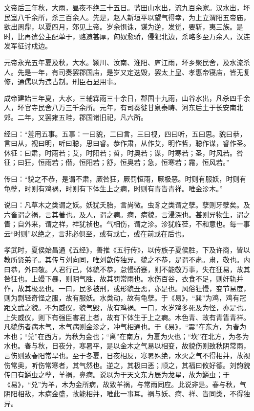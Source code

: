 \documentclass[]{article}
\begin{document}
文帝后三年秋，大雨，昼夜不绝三十五日。蓝田山水出，流九百余家。汉水出，坏民室八千余所，杀三百余人。先是，赵人新垣平以望气得幸，为上立渭阳五帝庙，欲出周鼎，以夏四月，郊见上帝。岁余惧诛，谋为逆，发觉，要斩，夷三族。是时，比再遣公主配单于，赂遗甚厚，匈奴愈骄，侵犯北边，杀略多至万余人，汉连发军征讨戍边。

元帝永光五年夏及秋，大水。颍川、汝南、淮阳、庐江雨，坏乡聚民舍，及水流杀人。先是一年，有司奏罢郡国庙，是岁又定迭毁，罢太上皇、孝惠帝寝庙，皆无复修，通儒以为违古制。刑臣石显用事。

成帝建始三年夏，大水，三辅霖雨三十余日，郡国十九雨，山谷水出，凡杀四千余人，坏官寺民舍八万三千余所。元年，有司奏徙甘泉泰畴、河东后土于长安南北郊。二年，又罢雍五畦，郡国诸旧祀，凡六所。

经曰：``羞用五事。五事：一曰貌，二曰言，三曰视，四曰听，五曰思。貌曰恭，言曰从，视曰明，听曰聪，思曰睿。恭作肃，从作艾，明作哲，聪作谋，睿作圣。休征：曰肃，时雨若；艾，时阳若；哲，时奥若；谋，时寒若；圣，时风若。咎征；曰狂，恒雨若；僣，恒阳若；舒，恒奥若；急，恒寒若；霿，恒风若。''

传曰：``貌之不恭，是谓不肃，厥咎狂，厥罚恒雨，厥极恶。时则有服妖，时则有龟孽，时则有鸡祸，时则有下体生上之痾，时则有青眚青祥。唯金沴木。''

说曰：凡草木之类谓之妖。妖犹夭胎，言尚微。虫豸之类谓之孽。孽则牙孽矣。及六畜谓之祸，言其著也。及人，谓之痾。痾，病貌，言浸深也。甚则异物生，谓之眚；自外来，谓之祥，祥犹祯也。气相伤，谓之沴。沴犹临莅，不和意也。每一事云``时则''以绝之，言非必俱至，或有或亡，或在前或在后也。

孝武时，夏侯始昌通《五经》，善推《五行传》，以传族子夏侯胜，下及许商，皆以教所贤弟子。其传与刘向同，唯刘歆传独异。貌之不恭，是谓不肃。肃，敬也。内曰恭，外曰敬。人君行己，体貌不恭，怠慢骄蹇，则不能敬万事，失在狂易，故其咎狂也。上嫚下暴，则阴气胜，故其罚常雨也。水伤百谷，衣食不足，则奸轨并作，故其极恶也。一曰，民多被刑，或形貌丑恶，亦是也。风俗狂慢，变节易度，则为剽轻奇怪之服，故有服妖。水类动，故有龟孽。于《易》，``巽''为鸡，鸡有冠距文武之貌。不为威仪，貌气毁，故有鸡祸。一曰，水岁鸡多死及为怪，亦是也。上失威仪，则下有强臣害君上者，故有下体生于上之痾。木色青、故有青眚青祥。凡貌伤者病木气，木气病则金沴之，冲气相通也。于《易》，``震''在东方，为春为木也；``兑''在西方，为秋为金也；``离''在南方，为夏为火也；``坎''在北方，为冬为水也。春与秋，日夜分，寒暑平，是以金木之气易以相变，故貌伤则致秋阴常雨，言伤则致春阳常旱也。至于冬夏，日夜相反，寒暑殊绝，水火之气不得相并，故视伤常奥，听伤常寒者，其气然也。逆之，其极曰恶；顺之，其福曰攸好德。刘韵貌传曰有鳞虫之孽，羊祸，鼻痾。说以为于天文东方辰为龙星，故为鳞虫；于《易》，``兑''为羊，木为金所病，故致羊祸，与常雨同应。此说非是。春与秋，气阴阳相敌，木病金盛，故能相并，唯此一事耳。祸与妖、痾、祥、眚同类，不得独异。
\end{document}
